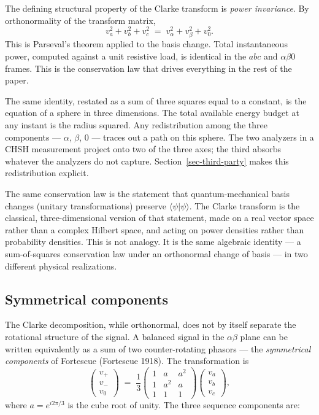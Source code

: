 \documentclass[
  11pt]{article}
\begin{document}
The defining structural property of the Clarke transform is \emph{power
invariance}. By orthonormality of the transform matrix, \[
v_a^2 + v_b^2 + v_c^2 \;=\; v_\alpha^2 + v_\beta^2 + v_0^2.
\] This is Parseval's theorem applied to the basis change. Total
instantaneous power, computed against a unit resistive load, is
identical in the \(abc\) and \(\alpha\beta 0\) frames. This is the
conservation law that drives everything in the rest of the paper.

The same identity, restated as a sum of three squares equal to a
constant, is the equation of a sphere in three dimensions. The total
available energy budget at any instant is the radius squared. Any
redistribution among the three components --- \(\alpha\), \(\beta\),
\(0\) --- traces out a path on this sphere. The two analyzers in a CHSH
measurement project onto two of the three axes; the third absorbs
whatever the analyzers do not capture. Section~\ref{sec-third-party}
makes this redistribution explicit.

The same conservation law is the statement that quantum-mechanical basis
changes (unitary transformations) preserve \(\langle\psi|\psi\rangle\).
The Clarke transform is the classical, three-dimensional version of that
statement, made on a real vector space rather than a complex Hilbert
space, and acting on power densities rather than probability densities.
This is not analogy. It is the same algebraic identity --- a
sum-of-squares conservation law under an orthonormal change of basis ---
in two different physical realizations.

\subsection{Symmetrical components}\label{symmetrical-components}

The Clarke decomposition, while orthonormal, does not by itself separate
the rotational structure of the signal. A balanced signal in the
\(\alpha\beta\) plane can be written equivalently as a sum of two
counter-rotating phasors --- the \emph{symmetrical components} of
Fortescue (Fortescue 1918). The transformation is \[
\begin{pmatrix} v_+ \\ v_- \\ v_0 \end{pmatrix} \;=\; \frac{1}{3}\begin{pmatrix} 1 & a & a^2 \\ 1 & a^2 & a \\ 1 & 1 & 1 \end{pmatrix} \begin{pmatrix} v_a \\ v_b \\ v_c \end{pmatrix},
\] where \(a = e^{i 2\pi/3}\) is the cube root of unity. The three
sequence components are:
\end{document}
